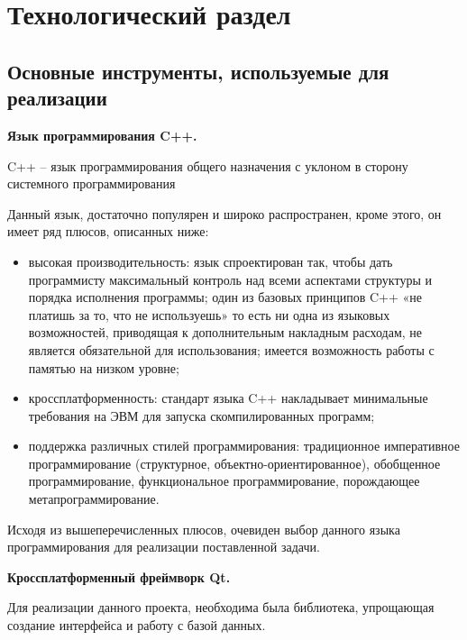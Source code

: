 \chapter{Технологический раздел}
\label{cha:impl}


\section{Основные инструменты, используемые для реализации}

\noindent\textbf{Язык программирования C++.}

C++ -- язык программирования общего назначения с уклоном в сторону системного программирования \cite{Cpp}

Данный язык, достаточно популярен и широко распространен, кроме этого, он имеет ряд плюсов, описанных ниже:

\begin{itemize}
	\item высокая производительность: язык спроектирован так, чтобы дать программисту максимальный контроль над всеми аспектами структуры и порядка исполнения программы; один из базовых принципов C++ «не платишь за то, что не используешь» то есть ни одна из языковых возможностей, приводящая к дополнительным накладным расходам, не является обязательной для использования; имеется возможность работы с памятью на низком уровне;
	\item кроссплатформенность: стандарт языка C++ накладывает минимальные требования на ЭВМ для запуска скомпилированных программ;
	\item поддержка различных стилей программирования: традиционное императивное программирование (структурное, объектно-ориентированное), обобщенное программирование, функциональное программирование, порождающее метапрограммирование.
\end{itemize}

Исходя из вышеперечисленных плюсов, очевиден выбор данного языка программирования для реализации поставленной задачи. %

\noindent\textbf{Кроссплатформенный фреймворк Qt.}

Для реализации данного проекта, необходима была библиотека, упрощающая создание интерфейса и работу с базой данных.

